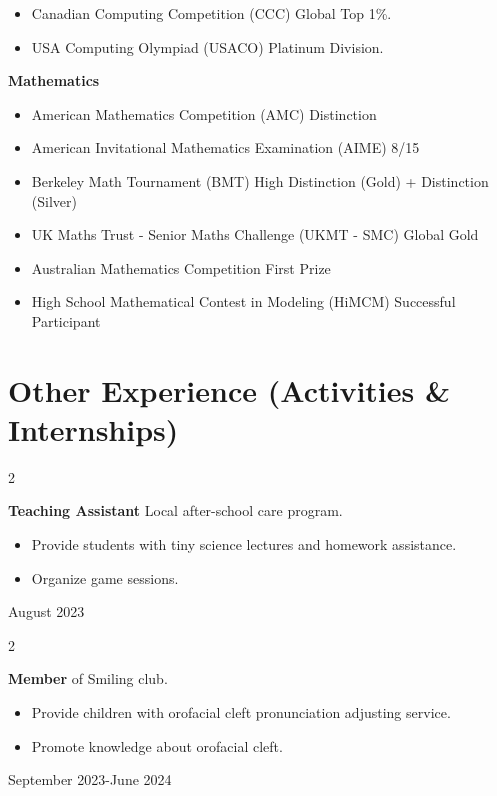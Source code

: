 \documentclass[10pt, letterpaper]{article}
\newenvironment{highlights}{
    \begin{itemize}[
        topsep=0.10 cm,
        parsep=0.10 cm,
        partopsep=0pt,
        itemsep=0pt,
        leftmargin=0.4 cm + 10pt
    ]
}{
    \end{itemize}
} %
\newenvironment{twocolentry}[2][]{
    \onecolentry
    \def\secondColumn{#2}
    \setcolumnwidth{\fill, 4.5 cm}
    \begin{paracol}{2}
}{
    \switchcolumn \raggedleft \secondColumn
    \end{paracol}
    \endonecolentry
} %
\begin{document}
    \begin{highlights}
        \item Canadian Computing Competition (CCC) \hfill Global Top 1\%.

        \item USA Computing Olympiad (USACO) \hfill Platinum Division.
    \end{highlights}

    \textbf{Mathematics}
    
    \begin{highlights}
        \item American Mathematics Competition (AMC) \hfill Distinction

        \item American Invitational Mathematics Examination (AIME) \hfill 8/15

        \item Berkeley Math Tournament (BMT) \hfill High Distinction (Gold) + Distinction (Silver)

        \item UK Maths Trust - Senior Maths Challenge (UKMT - SMC) \hfill Global Gold

        \item Australian Mathematics Competition \hfill First Prize

        \item High School Mathematical Contest in Modeling (HiMCM) \hfill Successful Participant
    \end{highlights}
    


    
    \section{Other Experience (Activities \& Internships)}    
        \begin{twocolentry}{ August 2023 }
            \textbf{Teaching Assistant} Local after-school care program.

            \begin{highlights}
                \item Provide students with tiny science lectures and homework assistance.
                \item Organize game sessions.
            \end{highlights}
        \end{twocolentry}

        \begin{twocolentry}{ September 2023-June 2024}
            \textbf{Member} of Smiling club.

            \begin{highlights}
                \item Provide children with orofacial cleft pronunciation adjusting service.
                \item Promote knowledge about orofacial cleft.
            \end{highlights}
        \end{twocolentry}
\end{document}
